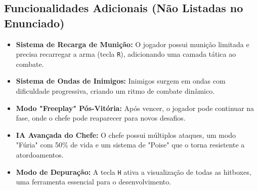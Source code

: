 \documentclass[11pt, a4paper]{article}
\begin{document}
\subsection{Funcionalidades Adicionais (Não Listadas no Enunciado)}
\begin{itemize}
    \item \textbf{Sistema de Recarga de Munição:} O jogador possui munição limitada e precisa recarregar a arma (tecla \texttt{R}), adicionando uma camada tática ao combate.
    \item \textbf{Sistema de Ondas de Inimigos:} Inimigos surgem em ondas com dificuldade progressiva, criando um ritmo de combate dinâmico.
    \item \textbf{Modo "Freeplay" Pós-Vitória:} Após vencer, o jogador pode continuar na fase, onde o chefe pode reaparecer para novos desafios.
    \item \textbf{IA Avançada do Chefe:} O chefe possui múltiplos ataques, um modo "Fúria" com 50\% de vida e um sistema de "Poise" que o torna resistente a atordoamentos.
    \item \textbf{Modo de Depuração:} A tecla \texttt{H} ativa a visualização de todas as hitboxes, uma ferramenta essencial para o desenvolvimento.
\end{itemize}
\end{document}
